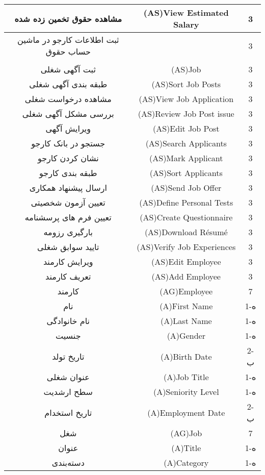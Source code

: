 \documentclass[12pt]{article}
\begin{document}
\begin{longtable}{|c|c|c|}
		\hline
		مشاهده حقوق تخمین زده شده & (AS)View Estimated Salary & 3     \\
		\hline
		ثبت اطلاعات کارجو در ماشین حساب حقوق & 
		\lr{(AS)Submit Applicant Info } & 3 \\
		& \lr{in Salary Calculator} & \\
		\hline
		ثبت آگهی شغلی & (AS)Job  & 3     \\
		\hline
		طبقه بندی آگهی شغلی & (AS)Sort Job Posts & 3     \\
		\hline
		مشاهده درخواست شغلی & (AS)View Job Application & 3     \\
		\hline
		بررسی مشکل آگهی شغلی & (AS)Review Job Post issue & 3     \\
		\hline
		ویرایش آگهی & (AS)Edit Job Post & 3     \\
		\hline
		جستجو در بانک کارجو & (AS)Search Applicants & 3     \\
		\hline
		نشان کردن کارجو & (AS)Mark Applicant & 3     \\
		\hline
		طبقه بندی کارجو & (AS)Sort Applicants & 3     \\
		\hline
		ارسال پیشنهاد همکاری & (AS)Send Job Offer & 3     \\
		\hline
		تعیین آزمون شخصیتی & (AS)Define Personal Tests & 3     \\
		\hline
		تعیین فرم های پرسشنامه & (AS)Create Questionnaire & 3     \\
		\hline
		بارگیری رزومه & (AS)Download Résumé & 3     \\
		\hline
		تایید سوابق شغلی & (AS)Verify Job Experiences & 3     \\
		\hline
		ویرایش کارمند & (AS)Edit Employee & 3     \\
		\hline
		تعریف کارمند & (AS)Add Employee & 3     \\
		\hline
		کارمند & (AG)Employee & 7     \\
		\hline
		نام & (A)First Name & 1-ه   \\
		\hline
		نام خانوادگی & (A)Last Name & 1-ه   \\
		\hline
		جنسیت & (A)Gender & 1-ه   \\
		\hline
		تاریخ تولد & (A)Birth Date & 2-ب   \\
		\hline
		عنوان شغلی & (A)Job Title & 1-ه   \\
		\hline
		سطح ارشدیت & (A)Seniority Level & 1-ه   \\
		\hline
		تاریخ استخدام & (A)Employment Date & 2-ب   \\
		\hline
		شغل & (AG)Job & 7     \\
		\hline
		عنوان & (A)Title & 1-ه   \\
		\hline
		دسته‌بندی & (A)Category & 1-ه   \\
		\hline
	\end{longtable}
	
\end{document}
